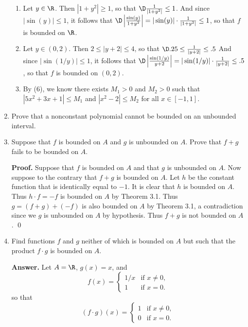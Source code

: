 \begin{enumerate}
			\begin{enumerate}
				\item Let $y \in \R$. Then $|1 + y^2| \ge 1$, so that
						$\D\frac{1}{|1 + y^2|} \le 1$. And since $|\sin(y)| \le 1$, it
						follows that
						$\D\left|\frac{\sin(y)}{1 + y^2}\right| = |\sin(y)| \cdot
						\frac{1}{|1 + y^2|} \le 1$, so that $f$ is bounded on $\R$.
				\item Let $y \in (0, 2)$. Then $2 \le |y + 2| \le 4$, so that
						$\D.25 \le \frac{1}{|y + 2|} \le .5$ And since
						$|\sin(1/y)| \le 1$, it	follows that
						$\D\left|\frac{\sin(1/y)}{y + 2}\right| = |\sin(1/y)| \cdot
						\frac{1}{|y + 2|} \le .5$, so that $f$ is bounded on $(0,2)$.
				\item By (6), we know there exists $M_1 > 0$	and $M_2 > 0$ such that
						$|5x^2 + 3x + 1| \le M_1$ and	$|x^2 - 2| \le M_2$ for all
						$x \in [-1, 1]$.
			\end{enumerate}
   \item Prove that a nonconstant polynomial cannot be bounded on an unbounded
         interval.
   \item Suppose that $f$ is bounded on $A$ and $g$ is unbounded on $A$. Prove
         that $f + g$ fails to be bounded on $A$.

      \textbf{Proof.} Suppose that $f$ is bounded on $A$ and that $g$ is
      unbounded on $A$. Now suppose to the contrary that $f + g$ is bounded on
      $A$. Let $h$ be the constant function that is identically equal to $-1$.
      It is clear that $h$ is bounded on $A$. Thus $h \cdot f = -f$ is bounded
      on $A$ by Theorem 3.1. Thus $g = (f + g) + (-f)$ is also bounded on $A$ by
      Theorem 3.1, a contradiction since we $g$ is unbounded on $A$ by 
      hypothesis. Thus $f + g$ is not bounded on $A$. \qed
   \item Find functions $f$ and $g$ neither of which is bounded on $A$ but such
         that the product $f \cdot g$ is bounded on $A$.

      \textbf{Answer.} Let $A = \R$, $g(x) = x$, and
      \begin{equation*}
         f(x) = \left\{
             \begin{array}{rl}
                1/x & \text{if } x \neq 0,\\
                1 & \text{if } x = 0.
             \end{array} \right.
      \end{equation*}
      so that
      \begin{equation*}
         (f \cdot g)(x) = \left\{
             \begin{array}{rl}
                1 & \text{if } x \neq 0,\\
                0 & \text{if } x = 0.
             \end{array} \right.
      \end{equation*}


\end{enumerate}
